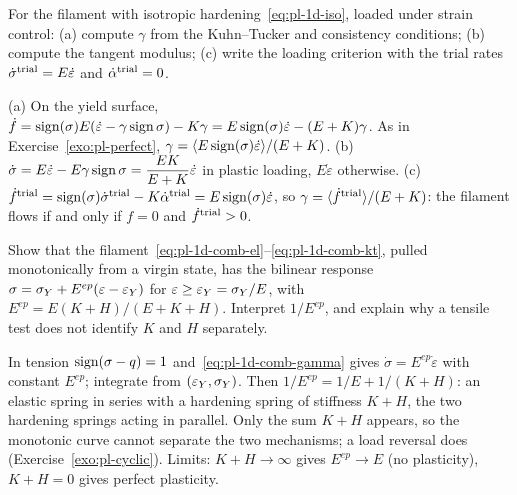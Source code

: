 \label{exo:pl-iso}
For the filament with isotropic hardening~\eqref{eq:pl-1d-iso}, loaded under
strain control: (a) compute $\gamma$ from the Kuhn--Tucker and consistency
conditions; (b) compute the tangent modulus; (c) write the loading criterion
with the trial rates $\dot\sigma^{\mathrm{trial}}=E\dot\varepsilon$ and
$\dot\alpha^{\mathrm{trial}}=0$.
\begin{solution}
(a) On the yield surface, $\dot f=\operatorname{sign}(\sigma)E(\dot\varepsilon-\gamma\operatorname{sign}\sigma)-K\gamma
=E\operatorname{sign}(\sigma)\dot\varepsilon-(E+K)\gamma$. As in Exercise~\ref{exo:pl-perfect},
$\gamma=\langle E\operatorname{sign}(\sigma)\dot\varepsilon\rangle/(E+K)$.
(b) $\displaystyle \dot\sigma=E\dot\varepsilon-E\gamma\operatorname{sign}\sigma=\frac{EK}{E+K}\dot\varepsilon$ in
plastic loading, $E\dot\varepsilon$ otherwise.
(c) $\dot f^{\mathrm{trial}}=\operatorname{sign}(\sigma)\dot\sigma^{\mathrm{trial}}-K\dot\alpha^{\mathrm{trial}}=E\operatorname{sign}(\sigma)\dot\varepsilon$,
so $\gamma=\langle \dot f^{\mathrm{trial}}\rangle/(E+K)$: the filament flows if and only if $f=0$
and $\dot f^{\mathrm{trial}}>0$.
\end{solution}

\label{exo:pl-mono}
Show that the filament~\eqref{eq:pl-1d-comb-el}--\eqref{eq:pl-1d-comb-kt},
pulled monotonically from a virgin state, has the bilinear response
$\sigma=\sigma_{Y}+E^{ep}(\varepsilon-\varepsilon_Y)$ for
$\varepsilon\ge\varepsilon_Y=\sigma_{Y}/E$, with $E^{ep}=E(K+H)/(E+K+H)$. Interpret
$1/E^{ep}$, and explain why a tensile test does not identify $K$ and $H$
separately.
\begin{solution}
In tension $\operatorname{sign}(\sigma-q)=1$ and~\eqref{eq:pl-1d-comb-gamma} gives
$\dot\sigma=E^{ep}\dot\varepsilon$ with constant $E^{ep}$; integrate from
$(\varepsilon_Y,\sigma_{Y})$. Then $1/E^{ep}=1/E+1/(K+H)$: an elastic spring in series
with a hardening spring of stiffness $K+H$, the two hardening springs acting
in parallel. Only the sum $K+H$ appears, so the monotonic curve cannot
separate the two mechanisms; a load reversal does
(Exercise~\ref{exo:pl-cyclic}). Limits: $K+H\to\infty$ gives $E^{ep}\to E$
(no plasticity), $K+H=0$ gives perfect plasticity.
\end{solution}

